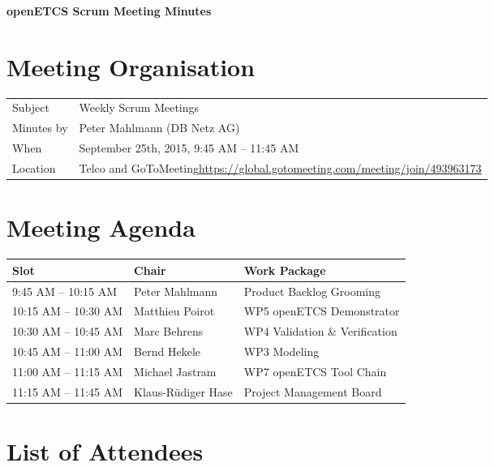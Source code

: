 \documentclass[a4paper, 11pt]{article}
\begin{document}
{\begin{center}\huge\bf openETCS Scrum Meeting Minutes\end{center}}

\section{Meeting Organisation}

\renewcommand{\arraystretch}{1.5}
\begin{supertabular}{m{.2\textwidth}m{.8\textwidth}}
Subject & Weekly Scrum Meetings\\
Minutes by & Peter Mahlmann (DB Netz AG)\\
When & September 25th, 2015, 9:45 AM -- 11:45 AM\\
Location & Telco and GoToMeeting\newline \url{https://global.gotomeeting.com/meeting/join/493963173}\\
\end{supertabular}

\renewcommand{\arraystretch}{1.0}
\section{Meeting Agenda}

\begin{tabular}{lll}
\toprule
\textbf{Slot} &  \textbf{Chair} & \textbf{Work Package} \\
\midrule 
9:45 AM -- 10:15 AM & Peter Mahlmann & Product Backlog Grooming  \\
10:15 AM -- 10:30 AM & Matthieu Poirot & WP5 openETCS Demonstrator \\  
10:30 AM -- 10:45 AM & Marc Behrens & WP4 Validation \& Verification \\
10:45 AM -- 11:00 AM & Bernd Hekele & WP3 Modeling \\
11:00 AM -- 11:15 AM & Michael Jastram & WP7 openETCS Tool Chain \\
11:15 AM -- 11:45 AM & Klaus-R\"udiger Hase & Project Management Board \\
\bottomrule
\end{tabular}

\section{List of Attendees}
\end{document}
